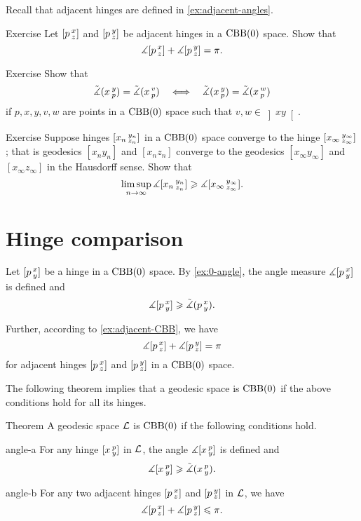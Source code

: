 Recall that adjacent hinges are defined in \ref{ex:adjacent-angles}.

\begin{thm}{Exercise}\label{ex:adjacent-CBB}
Let $[p\,{}^{x}_{z}]$ and $[p\,{}^{y}_{z}]$ be adjacent hinges in a $\mathrm{CBB}(0)$ space.
Show that
\[\measuredangle[p\,{}^{x}_{z}]+\measuredangle[p\,{}^{y}_{z}]= \pi.\]
\end{thm}


\begin{thm}{Exercise}\label{ex:pxyvw}
Show that  
\[
\tilde\measuredangle(x\,{}^{y}_{p})=\tilde\measuredangle(x\,{}^{v}_{p})
\quad\Longleftrightarrow\quad
\tilde\measuredangle(x\,{}^{y}_{p})=\tilde\measuredangle(x\,{}^{w}_{p})
\]
if 
$p,x,y,v,w$ are points in a $\mathrm{CBB}(0)$ space
such that $v,w\in \left]xy\right[$.
\end{thm}

\begin{thm}{Exercise}\label{ex:angle-lim}
Suppose hinges $[x_n\,{}^{y_n}_{z_n}]$ in a $\mathrm{CBB}(0)$ space converge to the hinge $[x_\infty\,{}^{y_\infty}_{z_\infty}]$;
that is geodesics $[x_ny_n]$ and $[x_nz_n]$ converge to the geodesics $[x_\infty y_\infty]$ and $[x_\infty z_\infty]$ in the Hausdorff sense.
Show that 
\[\limsup_{n\to\infty}\measuredangle [x_n\,{}^{y_n}_{z_n}]\geqslant \measuredangle [x_\infty\,{}^{y_\infty}_{z_\infty}].\]
\end{thm}

\section{Hinge comparison}

Let $[p\,{}^{x}_{y}]$ be a hinge in a $\mathrm{CBB}(0)$ space.
By \ref{ex:0-angle}, the angle measure $\measuredangle[p\,{}^{x}_{y}]$ is defined and
\[\measuredangle[p\,{}^{x}_{y}]\geqslant \tilde\measuredangle(p\,{}^{x}_{y}).\]

Further, according to \ref{ex:adjacent-CBB}, we have 
\[\measuredangle[p\,{}^{x}_{z}]+\measuredangle[p\,{}^{y}_{z}]=\pi\]
for adjacent hinges $[p\,{}^{x}_{z}]$ and $[p\,{}^{y}_{z}]$ in a $\mathrm{CBB}(0)$ space.

The following theorem implies that a geodesic space is $\mathrm{CBB}(0)$ if
the above conditions hold for all its hinges.

\begin{thm}{Theorem}\label{thm:angle-cbb}
A geodesic space $\mathcal{L}$ is $\mathrm{CBB}(0)$ if the following conditions hold.

\begin{subthm}{angle-a}
For any hinge $[x\,{}^{p}_{y}]$ in $\mathcal{L}$, the angle 
$\measuredangle[x\,{}^{p}_{y}]$ is defined and 
\[\measuredangle[x\,{}^{p}_{y}]\geqslant\tilde\measuredangle(x\,{}^{p}_{y}).\]
\end{subthm}

\begin{subthm}{angle-b}
For any two adjacent hinges $[p\,{}^{x}_{z}]$ and $[p\,{}^{y}_{z}]$ in $\mathcal{L}$, we have
\[\measuredangle[p\,{}^{x}_{z}]+\measuredangle[p\,{}^{y}_{z}]\leqslant\pi.\]
\end{subthm}

\end{thm}

